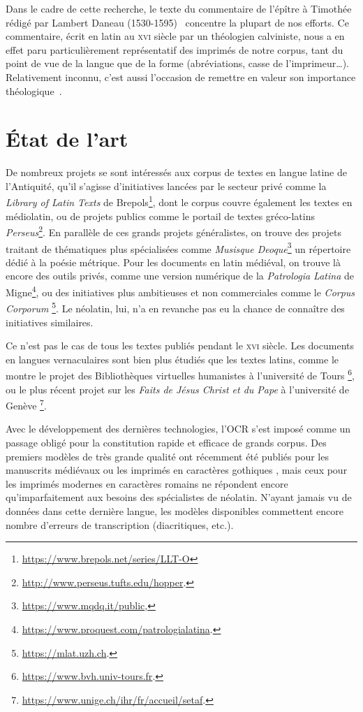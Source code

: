 \documentclass[11pt,french]{article}
\begin{document}
Dans le cadre de cette recherche, le texte du commentaire de l'épître à Timothée rédigé par Lambert Daneau (1530-1595)~\cite{daneau1577} concentre la plupart de nos efforts. Ce commentaire, écrit en latin au \textsc{xvi}\ieme{} siècle par un théologien calviniste, nous a en effet paru particulièrement représentatif des imprimés de notre corpus, tant du point de vue de la langue que de la forme (abréviations, casse de l'imprimeur…). Relativement inconnu, c'est aussi l'occasion de remettre en valeur son importance théologique~\cite{ZahndDaneauKommnetiert}.

\section{État de l'art}

De nombreux projets se sont intéressés aux corpus de textes en langue latine de l'Antiquité, qu'il s'agisse d'initiatives lancées par le secteur privé comme la \textit{Library of Latin Texts} de Brepols\footnote{\url{https://www.brepols.net/series/LLT-O}},
dont le corpus couvre également les textes en médiolatin, ou de projets publics comme le portail de textes gréco-latins \textit{Perseus}\footnote{\url{http://www.perseus.tufts.edu/hopper}.}. En parallèle de ces grands projets généralistes, on trouve des projets traitant de thématiques plus spécialisées comme \textit{Musisque Deoque}\footnote{\url{https://www.mqdq.it/public},} un répertoire dédié à la poésie métrique. Pour les documents en latin médiéval, on trouve là encore des outils privés, comme une version numérique de la \textit{Patrologia Latina} de Migne\footnote{\url{https://www.proquest.com/patrologialatina}.}, ou des initiatives plus ambitieuses et non commerciales comme le \textit{Corpus Corporum} \footnote{\url{https://mlat.uzh.ch}.}. Le néolatin, lui, n'a en revanche pas eu la chance de connaître des initiatives similaires.

Ce n'est pas le cas de tous les textes publiés pendant le \textsc{xvi}\ieme{} siècle. Les documents en langues vernaculaires sont bien plus étudiés que les textes latins, comme le montre le projet des Bibliothèques virtuelles humanistes à l'université de Tours \footnote{\url{https://www.bvh.univ-tours.fr}.}, ou le plus récent projet sur les \textit{Faits de Jésus Christ et du Pape} à l'université de Genève \footnote{\url{https://www.unige.ch/ihr/fr/accueil/setaf}.}.

Avec le développement des dernières technologies, l'OCR s'est imposé comme un passage obligé pour la constitution rapide et efficace de grands corpus. Des premiers modèles de très grande qualité ont récemment été publiés pour les manuscrits médiévaux \citep{pinche:hal-04346939,clerice:hal-04453952} ou les imprimés en caractères gothiques \cite{solfrini:hal-04555002}, mais ceux pour les imprimés modernes en caractères romains \cite{pincheGallicorpora2022,gabay:hal-04557457} ne répondent encore qu'imparfaitement aux besoins des spécialistes de néolatin. N'ayant jamais vu de données dans cette dernière langue, les modèles disponibles commettent encore nombre d'erreurs de transcription (diacritiques, etc.).
\end{document}
